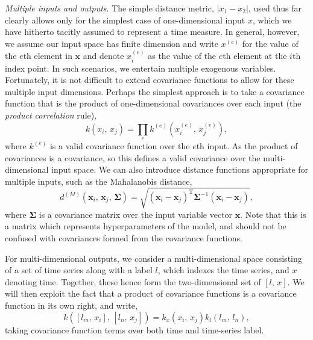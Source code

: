          \textit{Multiple inputs and outputs}. The simple distance metric, \(|x_{1} - x_{2}|\), used thus far clearly allows only for the simplest case of one-dimensional input \(x\), which we have hitherto tacitly assumed to represent a time measure. In general, however, we assume our input space has finite dimension and write \(x^{(e)}\) for the value of the \(e\)th element in \(\mathbf{x}\) and denote \(x_{i}^{(e)}\) as the value of the \(e\)th element at the \(i\)th index point. In such scenarios, we entertain multiple exogenous variables. Fortunately, it is not difficult to extend covariance functions to allow for these multiple input dimensions. Perhaps the simplest approach is to take a covariance function that is the product of one-dimensional covariances over each input (the \textit{product correlation} rule), \[k(x_{i}, \, x_{j}) = \prod_{e} k^{(e)} (x_{i}^{(e)}, \, x_{j}^{(e)}),\]
         where \(k^{(e)}\) is a valid covariance function over the \(e\)th input. As the product of covariances is a covariance, so this defines a valid covariance over the multi-dimensional input space. We can also introduce distance functions appropriate for multiple inputs, such as the Mahalanobis distance, \[d^{(M)}(\mathbf{x}_{i}, \, \mathbf{x}_{j}, \, \boldsymbol{\Sigma}) = \sqrt{(\mathbf{x}_{i} - \mathbf{x}_{j})^{\text{T}} \boldsymbol{\Sigma}^{-1} (\mathbf{x}_{i} - \mathbf{x}_{j})},\]
         where \(\boldsymbol{\Sigma}\) is a covariance matrix over the input variable vector \(\mathbf{x}\). Note that this is a matrix which represents hyperparameters of the model, and should not be confused with covariances formed from the covariance functions.

         For multi-dimensional outputs, we consider a multi-dimensional space consisting of a set of time series along with a label \(l\), which indexes the time series, and \(x\) denoting time. Together, these hence form the two-dimensional set of \([l, \, x]\). We will then exploit the fact that a product of covariance functions is a covariance function in its own right, and write, \[k([l_{m}, \, x_{i}], \, [l_{n}, \, x_{j}]) = k_{x} (x_{i}, \, x_{j}) k_{l} (l_{m}, \, l_{n}),\] taking covariance function terms over both time and time-series label.

         \vspace{1em}

